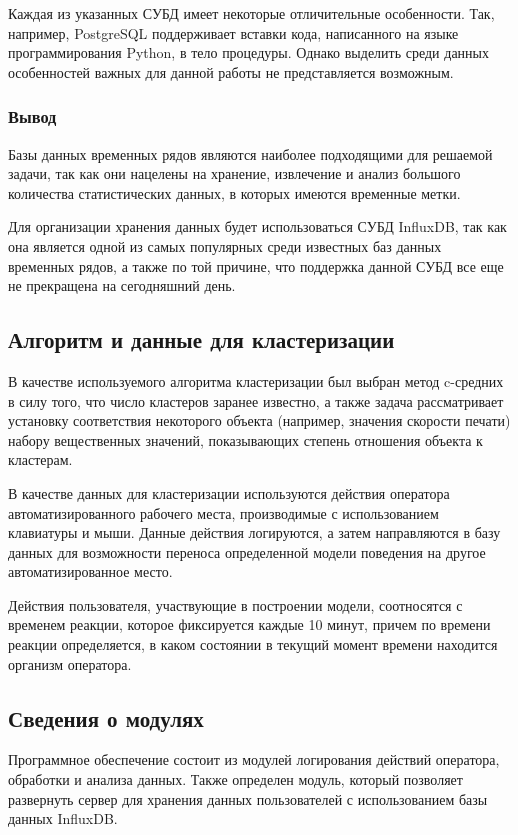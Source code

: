 Каждая из указанных СУБД имеет некоторые отличительные особенности. Так, например, PostgreSQL поддерживает вставки кода, написанного на языке программирования Python, в тело процедуры. Однако выделить среди данных особенностей важных для данной работы не представляется возможным.

\subsubsection*{Вывод}
Базы данных временных рядов являются наиболее подходящими для решаемой задачи, так как они нацелены на хранение, извлечение и анализ большого количества статистических данных, в которых имеются временные метки.

Для организации хранения данных будет использоваться СУБД InfluxDB, так как она является одной из самых популярных среди известных баз данных временных рядов, а также по той причине, что поддержка данной СУБД все еще не прекращена на сегодняшний день.

\subsection{Алгоритм и данные для кластеризации}
В качестве используемого алгоритма кластеризации был выбран метод c-средних в силу того, что число кластеров заранее известно, а также задача рассматривает установку соответствия некоторого объекта (например, значения скорости печати) набору вещественных значений, показывающих степень отношения объекта к кластерам.

В качестве данных для кластеризации используются действия оператора автоматизированного рабочего места, производимые с использованием клавиатуры и мыши. Данные действия логируются, а затем направляются в базу данных для возможности переноса определенной модели поведения на другое автоматизированное место.

Действия пользователя, участвующие в построении модели, соотносятся с временем реакции, которое фиксируется каждые 10 минут, причем по времени реакции определяется, в каком состоянии в текущий момент времени находится организм оператора.

\subsection{Сведения о модулях}
Программное обеспечение состоит из модулей логирования действий \newline оператора, обработки и анализа данных. Также определен модуль, который позволяет развернуть сервер для хранения данных пользователей с использованием базы данных InfluxDB.

